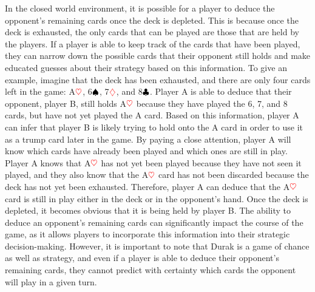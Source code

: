In the closed world environment, it is possible for a player to deduce the opponent's remaining cards once the deck is depleted. This is because once the deck is exhausted, the only cards that can be played are those that are held by the players. If a player is able to keep track of the cards that have been played, they can narrow down the possible cards that their opponent still holds and make educated guesses about their strategy based on this information. To give an example, imagine that the deck has been exhausted, and there are only four cards left in the game: A$\textcolor{red}{\heartsuit}$, 6$\textcolor{black}{\spadesuit}$, 7$\textcolor{red}{\diamondsuit}$, and 8$\textcolor{black}{\clubsuit}$. Player A is able to deduce that their opponent, player B, still holds A$\textcolor{red}{\heartsuit}$ because they have played the 6, 7, and 8 cards, but have not yet played the A card. Based on this information, player A can infer that player B is likely trying to hold onto the A card in order to use it as a trump card later in the game. By paying a close attention, player A will know which cards have already been played and which ones are still in play. Player A knows that A$\textcolor{red}{\heartsuit}$ has not yet been played because they have not seen it played, and they also know that the A$\textcolor{red}{\heartsuit}$ card has not been discarded because the deck has not yet been exhausted. Therefore, player A can deduce that the A$\textcolor{red}{\heartsuit}$ card is still in play either in the deck or in the opponent's hand. Once the deck is depleted, it becomes obvious that it is being held by player B. The ability to deduce an opponent's remaining cards can significantly impact the course of the game, as it allows players to incorporate this information into their strategic decision-making. However, it is important to note that Durak is a game of chance as well as strategy, and even if a player is able to deduce their opponent's remaining cards, they cannot predict with certainty which cards the opponent will play in a given turn. 